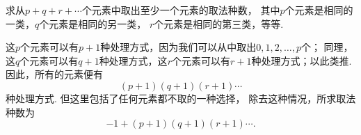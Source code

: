 \begin{example}
求从\(p+q+r+\dotsb\)个元素中取出至少一个元素的取法种数，
其中\(p\)个元素是相同的一类，\(q\)个元素是相同的另一类，
\(r\)个元素是相同的第三类，等等.
\begin{solution}
这\(p\)个元素可以有\(p+1\)种处理方式，因为我们可以从中取出\(0,1,2,\dotsc,p\)个；
同理，这\(q\)个元素可以有\(q+1\)种处理方式，这\(r\)个元素可以有\(r+1\)种处理方式；以此类推.
因此，所有的元素便有\begin{equation*}
	(p+1)(q+1)(r+1)\dotsm
\end{equation*}种处理方式.
但这里包括了任何元素都不取的一种选择，
除去这种情况，所求取法种数为\begin{equation*}
	-1+(p+1)(q+1)(r+1)\dotsm.
\end{equation*}
\end{solution}
\end{example}


